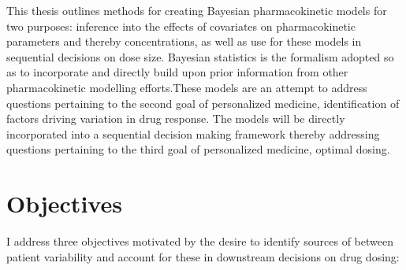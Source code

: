 This thesis outlines methods for creating Bayesian pharmacokinetic models for two purposes: inference into the effects of covariates on pharmacokinetic parameters and thereby concentrations, as well as use for these models in sequential decisions on dose size.    Bayesian statistics is the formalism adopted so as to incorporate and directly build upon prior information from other pharmacokinetic modelling efforts.These models are an attempt to address questions pertaining to the second goal of personalized medicine, identification of factors driving variation in drug response.  The models will be directly incorporated into a sequential decision making framework thereby addressing questions pertaining to the third goal of personalized medicine, optimal dosing.







% 




\section{Objectives}

I address three objectives motivated by the desire to identify sources of between patient variability and account for these in downstream decisions on drug dosing:

